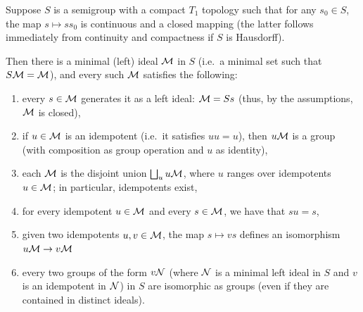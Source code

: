 	\begin{fct}
		\label{fct:minimal_ideals_idempotents}
		Suppose $S$ is a semigroup with a compact $T_1$ topology such that for any $s_0\in S$, the map $s\mapsto ss_0$ is continuous and a closed mapping (the latter follows immediately from continuity and compactness if $S$ is Hausdorff).
		
		Then there is a minimal (left) ideal ${\mathcal M}$ in $S$ (i.e.\ a minimal set such that $S{\mathcal M}={\mathcal M}$), and every such ${\mathcal M}$ satisfies the following:
		\begin{enumerate}
			\item
			every $s\in {\mathcal M}$ generates it as a left ideal: ${\mathcal M}=Ss$ (thus, by the assumptions, ${\mathcal M}$ is closed),
			\item
			if $u\in {\mathcal M}$ is an idempotent (i.e.\ it satisfies $uu=u$), then $u{\mathcal M}$ is a group (with composition as group operation and $u$ as identity),
			\item
			each ${\mathcal M}$ is the disjoint union $\bigsqcup_{u} u{\mathcal M}$, where $u$ ranges over idempotents $u\in {\mathcal M}$; in particular, idempotents exist,
			\item
			for every idempotent $u\in {\mathcal M}$ and every $s\in {\mathcal M}$, we have that $su=s$,
			\item
			given two idempotents $u,v\in {\mathcal M}$, the map $s\mapsto vs$ defines an isomorphism $u{\mathcal M}\to v{\mathcal M}$
			\item
			every two groups of the form $v{\mathcal N}$ (where ${\mathcal N}$ is a minimal left ideal in $S$ and $v$ is an idempotent in ${\mathcal N}$) in $S$ are isomorphic as groups (even if they are contained in distinct ideals).
		\end{enumerate}
	\end{fct}
